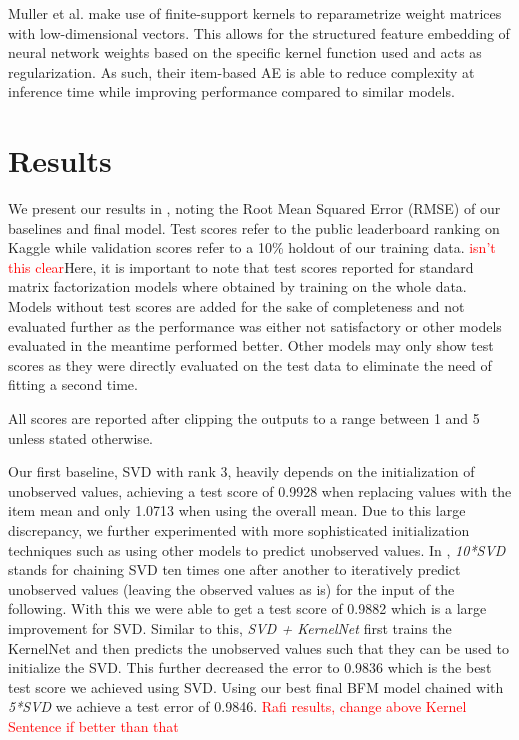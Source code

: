 \documentclass[10pt,conference,compsocconf]{IEEEtran}
\newcommand{\todo}[1]{\textcolor{red}{#1}}
\begin{document}
    Muller et al. make use of finite-support kernels to reparametrize weight matrices with low-dimensional vectors.
    This allows for the structured feature embedding of neural network weights based on the specific kernel function used and
    acts as regularization.
    As such, their item-based AE is able to reduce complexity at inference time while improving performance compared to similar models\cite{pmlr-v80-muller18a}.


    \section{Results}
    We present our results in , noting the Root Mean Squared Error (RMSE) of our baselines and final model.
    Test scores refer to the public leaderboard ranking on Kaggle while validation scores refer to a 10\% holdout of our training data.
    \todo{isn't this clear}Here, it is important to note that test scores reported for standard matrix factorization models where obtained by training on the whole data.
    Models without test scores are added for the sake of completeness and not evaluated further as the performance was either not satisfactory or other models evaluated in the meantime performed better.
    Other models may only show test scores as they were directly evaluated on the test data to eliminate the need of
    fitting a second time.

    All scores are reported after clipping the outputs to a range between 1 and 5 unless stated otherwise.%

    Our first baseline, SVD with rank 3, heavily depends on the initialization of unobserved values, achieving a test score of 0.9928 when replacing values with the item mean and only 1.0713 when using the overall mean.
    Due to this large discrepancy, we further experimented with more sophisticated initialization techniques such as using other models to predict unobserved values.
    In , \textit{10*SVD} stands for chaining SVD ten times one after another to iteratively predict unobserved values (leaving the observed values as is) for the input of the following.
    With this we were able to get a test score of 0.9882 which is a large improvement for SVD.
    Similar to this, \textit{SVD + KernelNet} first trains the KernelNet and then predicts the unobserved values such that they can be used to initialize the SVD.
    This further decreased the error to 0.9836 which is the best test score we achieved using SVD.
    Using our best final BFM model chained with \textit{5*SVD} we achieve a test error of 0.9846.
    \todo{Rafi results, change above Kernel Sentence if better than that}
\end{document}
